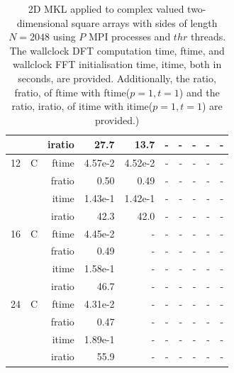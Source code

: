 \documentclass[a4paper]{article}
\begin{document}
\begin{table}[htbp]
\begin{center}
\begin{small}
\begin{tabular}{|r|r|r|r|r|r|r|r|r|r|}
            &            &  iratio &    27.7 &   13.7 &  - &   - &   - &   - &   - \\\hline
  12 &   C &   ftime &    4.57e-2 &    4.52e-2 &   - &   - &   - &   - &   - \\
            &            &  fratio &    0.50 &    0.49 &   - &   - &   - &   - &   - \\
            &            &  itime &    1.43e-1 &    1.42e-1 &   - &   - &   - &   - &   - \\
            &            &  iratio &    42.3 &   42.0 &  - &   - &   - &   - &   - \\\hline
  16 &   C &   ftime &    4.45e-2 &   - &   - &   - &   - &   - &   - \\
            &            &  fratio &    0.49 &   - &   - &   - &   - &   - &   - \\
            &            &  itime &    1.58e-1 &   - &   - &   - &   - &   - &   - \\
            &            &  iratio &    46.7 &  - &   - &   - &   - &   - &   - \\\hline
  24 &   C &   ftime &    4.31e-2 &   - &   - &   - &   - &   - &   - \\
            &            &  fratio &    0.47 &   - &   - &   - &   - &   - &   - \\
            &            &  itime &    1.89e-1 &   - &   - &   - &   - &   - &   - \\
            &            &  iratio &    55.9 &  - &   - &   - &   - &   - &   - \\\hline
\end{tabular}
\caption{2D MKL applied to complex valued two-dimensional square arrays with sides of length $N=2048$ using $P$ MPI processes and $thr$ threads. The wallclock DFT computation time, ftime, and wallclock FFT initialisation time, itime, both in seconds, are provided. Additionally, the ratio, fratio, of ftime  with ftime($p=1,t=1$) and the ratio, iratio, of itime  with itime($p=1,t=1$) are provided.) }\label{Tbl:MKL2d2048c}
\end{small}
\end{center}
\end{table}
\end{document}
